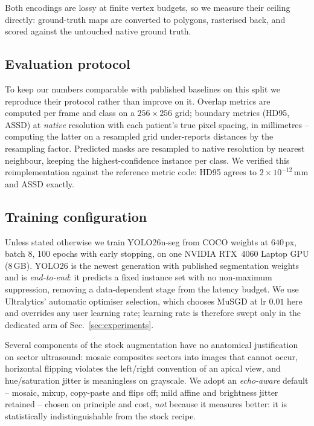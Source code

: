 Both encodings are lossy at finite vertex budgets, so we measure their ceiling
directly: ground-truth maps are converted to polygons, rasterised back, and
scored against the untouched native ground truth.

\subsection{Evaluation protocol}
\label{sec:protocol}

To keep our numbers comparable with published baselines on this split we
reproduce their protocol rather than improve on it. Overlap metrics are computed
per frame and class on a $256\times256$ grid; boundary metrics (HD95, ASSD) at
\emph{native} resolution with each patient's true pixel spacing, in millimetres
-- computing the latter on a resampled grid under-reports distances by the
resampling factor. Predicted masks are resampled to native resolution by nearest
neighbour, keeping the highest-confidence instance per class. We verified this
reimplementation against the reference metric code: HD95 agrees to
$2\times10^{-12}$\,mm and ASSD exactly.

\subsection{Training configuration}

Unless stated otherwise we train YOLO26n-seg from COCO weights at $640$\,px,
batch 8, 100 epochs with early stopping, on one NVIDIA RTX~4060 Laptop GPU
(8\,GB). YOLO26 is the newest generation with published segmentation weights and
is \emph{end-to-end}: it predicts a fixed instance set with no non-maximum
suppression, removing a data-dependent stage from the latency budget. We use
Ultralytics' automatic optimiser selection, which chooses MuSGD at lr $0.01$
here and overrides any user learning rate; learning rate is therefore swept only
in the dedicated arm of Sec.~\ref{sec:experiments}.

Several components of the stock augmentation have no anatomical justification on
sector ultrasound: mosaic composites sectors into images that cannot occur,
horizontal flipping violates the left/right convention of an apical view, and
hue/saturation jitter is meaningless on grayscale. We adopt an \emph{echo-aware}
default -- mosaic, mixup, copy-paste and flips off; mild affine and brightness
jitter retained -- chosen on principle and cost, \emph{not} because it measures
better: it is statistically indistinguishable from the stock recipe.
